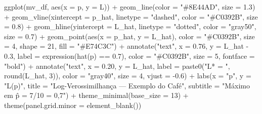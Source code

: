 \documentclass[
  letterpaper,
  DIV=11,
  numbers=noendperiod]{scrartcl}
\newenvironment{Shaded}{\begin{snugshade}}{\end{snugshade}}
\newcommand{\AttributeTok}[1]{\textcolor[rgb]{0.40,0.45,0.13}{#1}}
\newcommand{\DecValTok}[1]{\textcolor[rgb]{0.68,0.00,0.00}{#1}}
\newcommand{\FloatTok}[1]{\textcolor[rgb]{0.68,0.00,0.00}{#1}}
\newcommand{\FunctionTok}[1]{\textcolor[rgb]{0.28,0.35,0.67}{#1}}
\newcommand{\NormalTok}[1]{\textcolor[rgb]{0.00,0.23,0.31}{#1}}
\newcommand{\SpecialCharTok}[1]{\textcolor[rgb]{0.37,0.37,0.37}{#1}}
\newcommand{\StringTok}[1]{\textcolor[rgb]{0.13,0.47,0.30}{#1}}
\begin{document}
\begin{Shaded}
\begin{Highlighting}[]
\FunctionTok{ggplot}\NormalTok{(mv\_df, }\FunctionTok{aes}\NormalTok{(}\AttributeTok{x =}\NormalTok{ p, }\AttributeTok{y =}\NormalTok{ L)) }\SpecialCharTok{+}
  \FunctionTok{geom\_line}\NormalTok{(}\AttributeTok{color =} \StringTok{"\#8E44AD"}\NormalTok{, }\AttributeTok{size =} \FloatTok{1.3}\NormalTok{) }\SpecialCharTok{+}
  \FunctionTok{geom\_vline}\NormalTok{(}\AttributeTok{xintercept =}\NormalTok{ p\_hat, }\AttributeTok{linetype =} \StringTok{"dashed"}\NormalTok{,}
             \AttributeTok{color =} \StringTok{"\#C0392B"}\NormalTok{, }\AttributeTok{size =} \FloatTok{0.8}\NormalTok{) }\SpecialCharTok{+}
  \FunctionTok{geom\_hline}\NormalTok{(}\AttributeTok{yintercept =}\NormalTok{ L\_hat, }\AttributeTok{linetype =} \StringTok{"dotted"}\NormalTok{,}
             \AttributeTok{color =} \StringTok{"gray50"}\NormalTok{, }\AttributeTok{size =} \FloatTok{0.7}\NormalTok{) }\SpecialCharTok{+}
  \FunctionTok{geom\_point}\NormalTok{(}\FunctionTok{aes}\NormalTok{(}\AttributeTok{x =}\NormalTok{ p\_hat, }\AttributeTok{y =}\NormalTok{ L\_hat),}
             \AttributeTok{color =} \StringTok{"\#C0392B"}\NormalTok{, }\AttributeTok{size =} \DecValTok{4}\NormalTok{, }\AttributeTok{shape =} \DecValTok{21}\NormalTok{,}
             \AttributeTok{fill =} \StringTok{"\#E74C3C"}\NormalTok{) }\SpecialCharTok{+}
  \FunctionTok{annotate}\NormalTok{(}\StringTok{"text"}\NormalTok{, }\AttributeTok{x =} \FloatTok{0.76}\NormalTok{, }\AttributeTok{y =}\NormalTok{ L\_hat }\SpecialCharTok{{-}} \FloatTok{0.3}\NormalTok{,}
           \AttributeTok{label =} \FunctionTok{expression}\NormalTok{(}\FunctionTok{hat}\NormalTok{(p) }\SpecialCharTok{==} \FloatTok{0.7}\NormalTok{),}
           \AttributeTok{color =} \StringTok{"\#C0392B"}\NormalTok{, }\AttributeTok{size =} \DecValTok{5}\NormalTok{, }\AttributeTok{fontface =} \StringTok{"bold"}\NormalTok{) }\SpecialCharTok{+}
  \FunctionTok{annotate}\NormalTok{(}\StringTok{"text"}\NormalTok{, }\AttributeTok{x =} \FloatTok{0.20}\NormalTok{, }\AttributeTok{y =}\NormalTok{ L\_hat,}
           \AttributeTok{label =} \FunctionTok{paste0}\NormalTok{(}\StringTok{"L* = "}\NormalTok{, }\FunctionTok{round}\NormalTok{(L\_hat, }\DecValTok{3}\NormalTok{)),}
           \AttributeTok{color =} \StringTok{"gray40"}\NormalTok{, }\AttributeTok{size =} \DecValTok{4}\NormalTok{, }\AttributeTok{vjust =} \SpecialCharTok{{-}}\FloatTok{0.6}\NormalTok{) }\SpecialCharTok{+}
  \FunctionTok{labs}\NormalTok{(}\AttributeTok{x =} \StringTok{"p"}\NormalTok{, }\AttributeTok{y =} \StringTok{"L(p)"}\NormalTok{,}
       \AttributeTok{title =} \StringTok{"Log{-}Verossimilhança — Exemplo do Café"}\NormalTok{,}
       \AttributeTok{subtitle =} \StringTok{"Máximo em p̂ = 7/10 = 0,7"}\NormalTok{) }\SpecialCharTok{+}
  \FunctionTok{theme\_minimal}\NormalTok{(}\AttributeTok{base\_size =} \DecValTok{13}\NormalTok{) }\SpecialCharTok{+}
  \FunctionTok{theme}\NormalTok{(}\AttributeTok{panel.grid.minor =} \FunctionTok{element\_blank}\NormalTok{())}
\end{Highlighting}
\end{Shaded}
\end{document}
